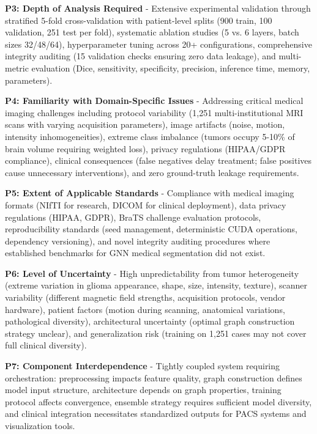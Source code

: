\textbf{P3: Depth of Analysis Required} - Extensive experimental validation through stratified 5-fold cross-validation with patient-level splits (900 train, 100 validation, 251 test per fold), systematic ablation studies (5 vs. 6 layers, batch sizes 32/48/64), hyperparameter tuning across 20+ configurations, comprehensive integrity auditing (15 validation checks ensuring zero data leakage), and multi-metric evaluation (Dice, sensitivity, specificity, precision, inference time, memory, parameters).

\textbf{P4: Familiarity with Domain-Specific Issues} - Addressing critical medical imaging challenges including protocol variability (1,251 multi-institutional MRI scans with varying acquisition parameters), image artifacts (noise, motion, intensity inhomogeneities), extreme class imbalance (tumors occupy 5-10\% of brain volume requiring weighted loss), privacy regulations (HIPAA/GDPR compliance), clinical consequences (false negatives delay treatment; false positives cause unnecessary interventions), and zero ground-truth leakage requirements.

\textbf{P5: Extent of Applicable Standards} - Compliance with medical imaging formats (NIfTI for research, DICOM for clinical deployment), data privacy regulations (HIPAA, GDPR), BraTS challenge evaluation protocols, reproducibility standards (seed management, deterministic CUDA operations, dependency versioning), and novel integrity auditing procedures where established benchmarks for GNN medical segmentation did not exist.

\textbf{P6: Level of Uncertainty} - High unpredictability from tumor heterogeneity (extreme variation in glioma appearance, shape, size, intensity, texture), scanner variability (different magnetic field strengths, acquisition protocols, vendor hardware), patient factors (motion during scanning, anatomical variations, pathological diversity), architectural uncertainty (optimal graph construction strategy unclear), and generalization risk (training on 1,251 cases may not cover full clinical diversity).

\textbf{P7: Component Interdependence} - Tightly coupled system requiring orchestration: preprocessing impacts feature quality, graph construction defines model input structure, architecture depends on graph properties, training protocol affects convergence, ensemble strategy requires sufficient model diversity, and clinical integration necessitates standardized outputs for PACS systems and visualization tools.

